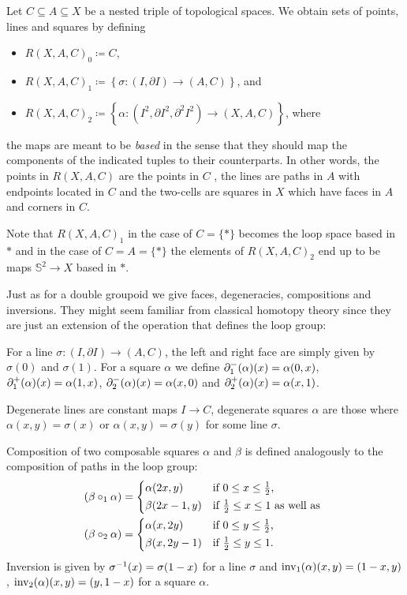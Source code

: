 \begin{defn} \label{def:filtered-maps}
Let $C \subseteq A \subseteq X$ be a nested triple of topological spaces.
We obtain sets of points, lines and squares by defining
\begin{itemize}
\item $R(X, A, C)_0 \coloneqq C$,
\item $R(X, A, C)_1 \coloneqq \left\{ \sigma : (I, \partial I) \to (A, C) \right\}$, and
\item $R(X, A, C)_2 \coloneqq \left\{ \alpha : (I^2, \partial I^2, \partial^2 I^2)
	\to (X, A, C) \right\}$, where
\end{itemize}
the maps are meant to be \emph{based} in the sense that they should map the
components of the indicated tuples to their counterparts.
In other words, the points in $R(X, A, C)$ are the points in $C$ , the lines
are paths in $A$ with endpoints located in $C$ and the two-cells are squares
in $X$ which have faces in $A$ and corners in $C$.

Note that $R(X, A, C)_1$ in the case of $C = \{ \ast \}$ becomes the loop space
based in $\ast$ and in the case of $C = A = \{ \ast \}$ the elements of
$R(X, A, C)_2$ end up to be maps $\mathbb{S}^2 \to X$ based in $\ast$.

Just as for a double groupoid we give faces, degeneracies, compositions
and inversions. They might seem familiar from classical homotopy theory
since they are just an extension of the operation that defines the loop group:

For a line $\sigma : (I, \partial I) \to (A , C)$, the left and right face are
simply given by $\sigma(0)$ and $\sigma(1)$. For a square $\alpha$ we define
$\partial^-_1(\alpha)(x) = \alpha(0,x)$, $\partial^+_1(\alpha)(x) = \alpha(1,x)$,
$\partial^-_2(\alpha)(x) = \alpha(x,0)$ and $\partial^+_2(\alpha)(x) = \alpha(x,1)$.

Degenerate lines are constant maps $I \to C$, degenerate squares $\alpha$ are
those where $\alpha(x,y) = \sigma(x)$ or $\alpha(x,y) = \sigma(y)$ for some
line $\sigma$.

Composition of two composable squares $\alpha$ and $\beta$ is defined analogously
to the composition of paths in the loop group:
\begin{align*}
(\beta \circ_1 \alpha) &= \begin{dcases*}
	\alpha(2x,y) & if $0 \leq x \leq \frac{1}{2}$, \\
	\beta(2x-1,y) & if $\frac{1}{2} \leq x \leq 1$ as well as
	\end{dcases*} \\
(\beta \circ_2 \alpha) &= \begin{dcases*}
	\alpha(x,2y) & if $0 \leq y \leq \frac{1}{2}$, \\
	\beta(x,2y-1) & if $\frac{1}{2} \leq y \leq 1$.
	\end{dcases*}
\end{align*}
Inversion is given by $\sigma^{-1}(x) = \sigma(1-x)$ for a line $\sigma$ and
$\operatorname{inv_1}(\alpha)(x,y) = (1-x,y)$, $\operatorname{inv_2}(\alpha)(x,y) = (y,1-x)$ for a square
$\alpha$.
\end{defn}

